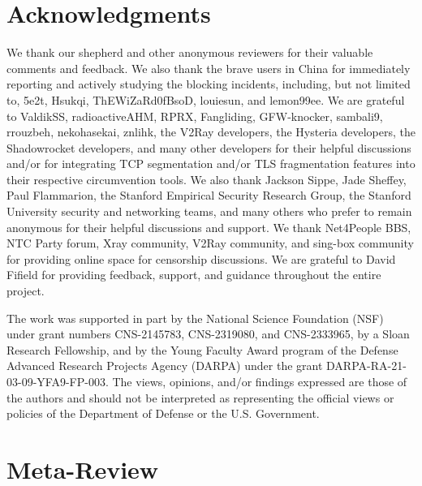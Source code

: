 \documentclass[conference,compsoc]{IEEEtran}
\begin{document}
\section*{Acknowledgments}
We thank our shepherd and other anonymous reviewers for their valuable comments and feedback.
We also thank the brave users in China for immediately reporting and actively studying the blocking incidents,
including, but not limited to,
5e2t, Hsukqi, ThEWiZaRd0fBsoD, louiesun, and lemon99ee.
We are grateful to
ValdikSS,
radioactiveAHM,
RPRX,
Fangliding,
GFW-knocker,
sambali9,
rrouzbeh,
nekohasekai,
znlihk,
the V2Ray developers,
the Hysteria developers,
the Shadowrocket developers,
and many other developers for
their helpful discussions
and/or for
integrating TCP segmentation and/or TLS fragmentation features into their respective circumvention tools.
We also thank
Jackson Sippe,
Jade Sheffey,
Paul Flammarion,
the Stanford Empirical Security Research Group,
the Stanford University security and networking teams,
and many others who prefer to remain anonymous
for their helpful discussions and support.
We thank Net4People BBS,
NTC Party forum,
Xray community, V2Ray community, and sing-box community
for providing online space for censorship discussions.
We are grateful to David Fifield for providing feedback, support, and guidance throughout the entire project.

The work was supported in part by the National Science Foundation (NSF) under grant numbers
CNS-2145783, CNS-2319080, and CNS-2333965,
by a Sloan Research Fellowship,
and by the
Young Faculty Award program of the Defense Advanced Research Projects
Agency (DARPA) under the grant DARPA-RA-21-03-09-YFA9-FP-003.
The views, opinions, and/or findings expressed are those of the
authors and should not be interpreted as representing the official
views or policies of the Department of Defense or the U.S. Government.


\balance




\newpage %

\appendices %

\section{Meta-Review}
\end{document}
